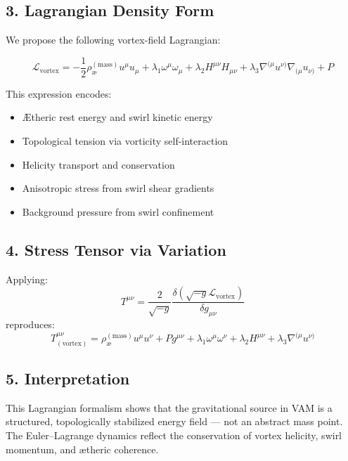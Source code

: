 \documentclass[twocolumn,aps,pre,floatfix,nofootinbib]{revtex4-2}
\begin{document}
    \subsection*{3. Lagrangian Density Form}

    We propose the following vortex-field Lagrangian:

    \begin{equation}
        \boxed{
            \mathcal{L}_{\text{vortex}} =
            -\frac{1}{2} \rho_{\text{\ae}}^{(\text{mass})} u^\mu u_\mu
            + \lambda_1 \omega^\mu \omega_\mu
            + \lambda_2 H^{\mu\nu} H_{\mu\nu}
            + \lambda_3 \nabla^{(\mu} u^{\nu)} \nabla_{(\mu} u_{\nu)}
            + P
        }
    \end{equation}

    This expression encodes:
    \begin{itemize}
        \item Ætheric rest energy and swirl kinetic energy
        \item Topological tension via vorticity self-interaction
        \item Helicity transport and conservation
        \item Anisotropic stress from swirl shear gradients
        \item Background pressure from swirl confinement
    \end{itemize}

    \subsection*{4. Stress Tensor via Variation}

    Applying:
    \[
        T^{\mu\nu} = \frac{2}{\sqrt{-g}} \frac{\delta (\sqrt{-g} \mathcal{L}_{\text{vortex}})}{\delta g_{\mu\nu}}
    \]
    reproduces:
    \[
        T^{\mu\nu}_{(\text{vortex})} = \rho_{\text{\ae}}^{(\text{mass})} u^\mu u^\nu + P g^{\mu\nu} + \lambda_1 \omega^\mu \omega^\nu + \lambda_2 H^{\mu\nu} + \lambda_3 \nabla^{(\mu} u^{\nu)}
    \]

    \subsection*{5. Interpretation}

    This Lagrangian formalism shows that the gravitational source in VAM is a structured, topologically stabilized energy field — not an abstract mass point. The Euler–Lagrange dynamics reflect the conservation of vortex helicity, swirl momentum, and ætheric coherence.
\end{document}
